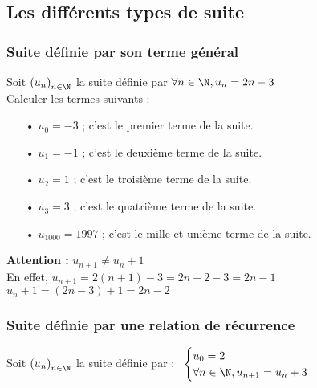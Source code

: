 \subsection{Les différents types de suite}

\subsubsection{Suite définie par son terme général}

Soit $\left(u_n\right)_{n \in \N}$ la suite définie par $\forall n \in \N, u_n = 2n - 3$ \\

Calculer les termes suivants : \\

\begin{itemize}
\item[•] $u_0 = -3$ ; c'est le premier terme de la suite.
\item[•] $u_1 = -1$ ; c'est le deuxième terme de la suite.
\item[•] $u_2 = 1$ ; c'est le troisième terme de la suite.
\item[•] $u_3 = 3$ ; c'est le quatrième terme de la suite.
\item[•] $u_{1000} = 1997$ ; c'est le mille-et-unième terme de la suite.
\end{itemize}

\vspace*{.3cm}

\textbf{Attention : } $u_{n+1} \neq u_n + 1$ \\

En effet, $u_{n+1} = 2\left(n+1\right) -3 = 2n + 2 - 3 = 2n - 1 $ \\

$u_n + 1 = \left(2n - 3\right) + 1 = 2n - 2$

\newpage

\subsubsection{Suite définie par une relation de récurrence}

Soit $\left(u_n\right)_{n \in \N}$ la suite définie par :$ \; \; \; \begin{cases}
u_0 = 2 \\
\forall n \in \N, u_{n+1} = u_n + 3 \\
\end{cases}$ \\

